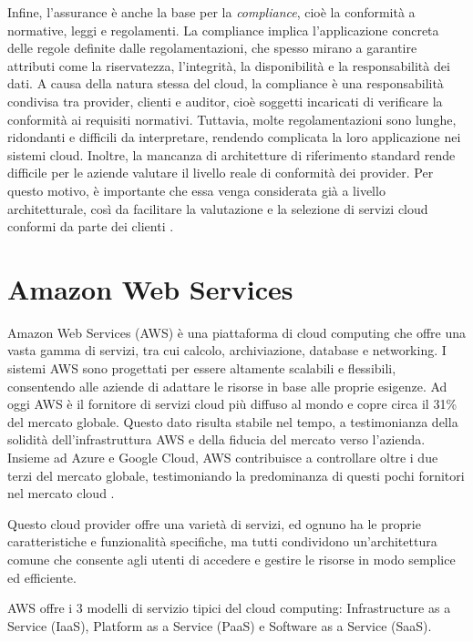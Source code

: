 Infine, l'assurance è anche la base per la \textit{compliance}, cioè la conformità a normative, leggi e regolamenti. La compliance implica l'applicazione concreta delle regole definite dalle regolamentazioni, che spesso mirano a garantire attributi come la riservatezza, l'integrità, la disponibilità e la responsabilità dei dati. A causa della natura stessa del cloud, la compliance è una responsabilità condivisa tra provider, clienti e auditor, cioè soggetti incaricati di verificare la conformità ai requisiti normativi. Tuttavia, molte regolamentazioni sono lunghe, ridondanti e difficili da interpretare, rendendo complicata la loro applicazione nei sistemi cloud. Inoltre, la mancanza di architetture di riferimento standard rende difficile per le aziende valutare il livello reale di conformità dei provider. Per questo motivo, è importante che essa venga considerata già a livello architetturale, così da facilitare la valutazione e la selezione di servizi cloud conformi da parte dei clienti \cite{yimam2016survey}.


\section{Amazon Web Services}
\label{sec:aws}

Amazon Web Services (AWS) è una piattaforma di cloud computing che offre una vasta gamma di servizi, tra cui calcolo, archiviazione, database e networking. I sistemi AWS sono progettati per essere altamente scalabili e flessibili, consentendo alle aziende di adattare le risorse in base alle proprie esigenze. Ad oggi AWS è il fornitore di servizi cloud più diffuso al mondo e copre circa il 31\% del mercato globale. Questo dato risulta stabile nel tempo, a testimonianza della solidità dell'infrastruttura AWS e della fiducia del mercato verso l'azienda. Insieme ad Azure e Google Cloud, AWS contribuisce a controllare oltre i due terzi del mercato globale, testimoniando la predominanza di questi pochi fornitori nel mercato cloud \cite{statista2024awsmarketshare}.

Questo cloud provider offre una varietà di servizi, ed ognuno ha le proprie caratteristiche e funzionalità specifiche, ma tutti condividono un'architettura comune che consente agli utenti di accedere e gestire le risorse in modo semplice ed efficiente.

AWS offre i 3 modelli di servizio tipici del cloud computing: Infrastructure as a Service (IaaS), Platform as a Service (PaaS) e Software as a Service (SaaS).

